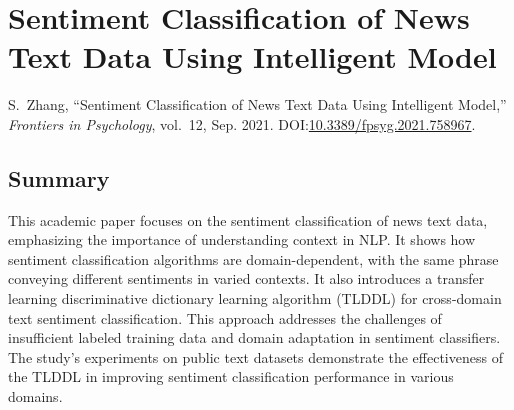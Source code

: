 
\section[Sentiment Classification of News Data]{Sentiment Classification of News Text Data Using Intelligent Model}






\begin{thebibliography}{1}

S.~Zhang, ``Sentiment Classification of News Text Data Using Intelligent Model,'' \emph{Frontiers in Psychology}, vol.~12, Sep. 2021. DOI:\@ \href{https://doi.org/10.3389/fpsyg.2021.758967}{10.3389/fpsyg.2021.758967}.

\end{thebibliography}

\subsection{Summary}
This academic paper focuses on the sentiment classification of news text data, emphasizing the importance of understanding context in NLP. It shows how sentiment classification algorithms are domain-dependent, with the same phrase conveying different sentiments in varied contexts. It also introduces a transfer learning discriminative dictionary learning algorithm (TLDDL) for cross-domain text sentiment classification. This approach addresses the challenges of insufficient labeled training data and domain adaptation in sentiment classifiers. The study's experiments on public text datasets demonstrate the effectiveness of the TLDDL in improving sentiment classification performance in various domains.
